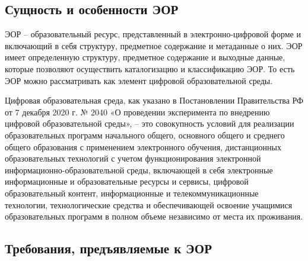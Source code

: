 \subsection{Сущность и особенности ЭОР}
ЭОР – образовательный ресурс, представленный в электронно-цифровой форме и включающий в себя структуру, предметное содержание и метаданные о них. ЭОР имеет определенную структуру, предметное содержание и выходные данные, которые позволяют осуществить каталогизацию и классификацию ЭОР\cite{gost}. То есть ЭОР можно рассматривать как элемент цифровой образовательной среды. 

Цифровая образовательная среда, как указано в Постановлении Правительства РФ от 7 декабря 2020 г. № 2040 «О проведении эксперимента по внедрению цифровой образовательной среды», – это совокупность условий для реализации образовательных программ начального общего, основного общего и среднего общего образования с применением электронного обучения, дистанционных образовательных технологий с учетом функционирования электронной информационно-образовательной среды, включающей в себя электронные информационные и образовательные ресурсы и сервисы, цифровой образовательный контент, информационные и телекоммуникационные технологии, технологические средства и обеспечивающей освоение учащимися образовательных программ в полном объеме независимо от места их проживания.

\large
\subsection{Требования, предъявляемые к ЭОР}

